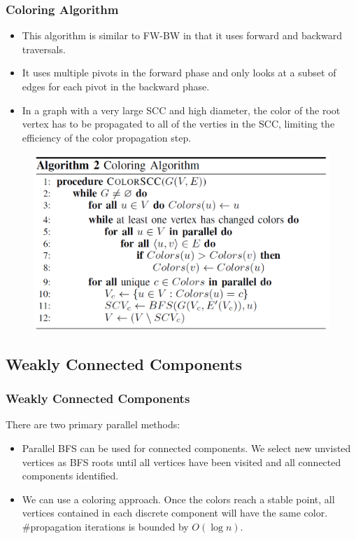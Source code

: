 \begin{frame}
	\frametitle{Coloring Algorithm}
	\begin{itemize}
		\setlength\itemsep{1em}
		\item This algorithm is similar to FW-BW in that it uses 
			forward and backward traversals.
		\item It uses multiple pivots in the forward phase and only looks at a 
			subset of edges for each pivot in the backward phase.
		\item In a graph with a very large SCC and high diameter, the color of
			the root vertex has to be propagated to all of the verties in the
			SCC, limiting the efficiency of the color propagation step.
	\end{itemize}
\end{frame}

\begin{frame}
	\begin{figure}
		\includegraphics[scale=0.30]{figure/fig-Coloring.png}
	\end{figure}
\end{frame}

\subsection{Weakly Connected Components}
\begin{frame}
	\frametitle{Weakly Connected Components}
	There are two primary parallel methods:
	\begin{itemize}
		\setlength\itemsep{1em}
		\item Parallel BFS can be used for connected components. 
			We select new unvisted vertices as BFS roots until all vertices 
			have been visited and all connected components identified.
		\item We can use a coloring approach. Once the colors reach 
			a stable point, all vertices contained in each discrete 
			component will have the same color. \#propagation iterations 
			is bounded by $O(\log n)$.
	\end{itemize}
\end{frame}

